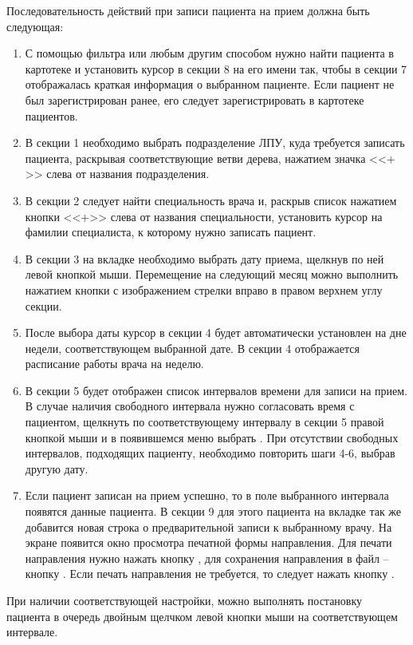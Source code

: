 Последовательность действий при записи пациента на прием должна быть следующая:
\begin{enumerate}
 \item С помощью фильтра или любым другим способом нужно найти пациента в картотеке и установить курсор в секции 8 на его имени так, чтобы в секции 7 отображалась краткая информация о выбранном пациенте. Если пациент не был зарегистрирован ранее, его следует зарегистрировать в картотеке пациентов.
 \item В секции 1 необходимо выбрать подразделение ЛПУ, куда требуется записать пациента, раскрывая соответствующие ветви дерева, нажатием значка <<$+$>> слева от названия подразделения.
 \item В секции 2 следует найти специальность врача и, раскрыв список нажатием кнопки <<$+$>> слева от названия специальности, установить курсор на фамилии специалиста, к которому нужно записать пациент.
 \item В секции 3 на вкладке  необходимо выбрать дату приема, щелкнув по ней левой кнопкой мыши. Перемещение на следующий месяц можно выполнить нажатием кнопки с изображением стрелки вправо в правом верхнем углу секции.
 \item После выбора даты курсор в секции 4 будет автоматически установлен на дне недели, соответствующем выбранной дате. В секции 4 отображается расписание работы врача на неделю.
 \item В секции 5 будет отображен список интервалов времени для записи на прием. В случае наличия свободного интервала нужно согласовать время с пациентом, щелкнуть по соответствующему интервалу в секции 5 правой кнопкой мыши и в появившемся меню выбрать . При отсутствии свободных интервалов, подходящих пациенту, необходимо повторить шаги 4-6, выбрав другую дату.
 \item Если пациент записан на прием успешно, то в поле  выбранного интервала появятся данные пациента. В секции 9 для этого пациента на вкладке  так же добавится новая строка о предварительной записи к выбранному врачу. На экране появится окно просмотра печатной формы направления. Для печати направления нужно нажать кнопку , для сохранения направления в файл – кнопку . Если печать направления не требуется, то следует нажать кнопку .
\end{enumerate}
  
\begin{prim}
 При наличии соответствующей настройки, можно выполнять постановку пациента в очередь двойным щелчком левой кнопки мыши на соответствующем интервале.
\end{prim}
 
